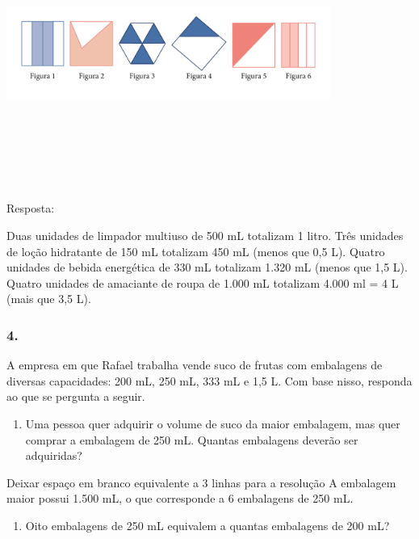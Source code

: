 \begin{enumerate}
\begin{escolha}
\begin{enumerate}
\begin{itemize}
\begin{itemize}
\begin{escolha}
\includegraphics[width=4.17536in,height=3.42530in]{media/image52.png}

Resposta:

Duas unidades de limpador multiuso de 500 mL totalizam 1 litro.
Três unidades de loção hidratante de 150 mL totalizam 450 mL (menos que 0,5 L).
Quatro unidades de bebida energética de 330 mL totalizam 1.320 mL (menos que 1,5 L).
Quatro unidades de amaciante de roupa de 1.000 mL totalizam 4.000 ml = 4 L (mais
que 3,5 L).

\subsubsection{4.}\label{section-42}

A empresa em que Rafael trabalha vende suco de frutas com embalagens de
diversas capacidades: 200 mL, 250 mL, 333 mL e 1,5 L. Com base nisso, responda ao que se pergunta a seguir.

\begin{enumerate}
\def\labelenumi{\alph{enumi})}
\item
  Uma pessoa quer adquirir o volume de suco da maior embalagem,
  mas quer comprar a embalagem de 250 mL. Quantas embalagens deverão ser adquiridas?
\end{enumerate}

Deixar espaço em branco equivalente a 3 linhas para a resolução
A embalagem maior possui 1.500 mL, o que corresponde a 6 embalagens de 250 mL.

\begin{enumerate}
\def\labelenumi{\alph{enumi})}
\item
  Oito embalagens de 250 mL equivalem a quantas embalagens de 200 mL?
\end{enumerate}


\end{escolha}
\end{itemize}
\end{itemize}
\end{enumerate}
\end{escolha}
\end{enumerate}
